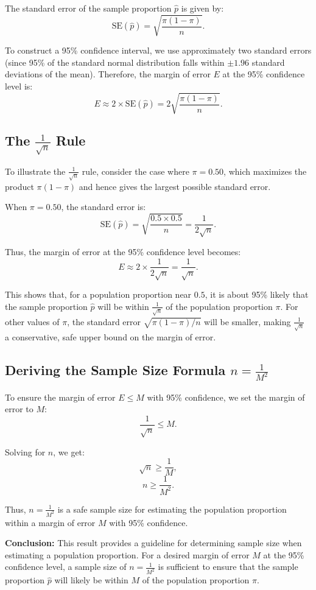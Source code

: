 \documentclass{article}
\begin{document}
The standard error of the sample proportion \( \hat{p} \) is given by:
\[
\text{SE}(\hat{p}) = \sqrt{\frac{\pi (1 - \pi)}{n}}.
\]

To construct a 95\% confidence interval, we use approximately two standard errors (since 95\% of the standard normal distribution falls within \(\pm 1.96\) standard deviations of the mean). Therefore, the margin of error \( E \) at the 95\% confidence level is:
\[
E \approx 2 \times \text{SE}(\hat{p}) = 2 \sqrt{\frac{\pi (1 - \pi)}{n}}.
\]

\subsection*{The \( \frac{1}{\sqrt{n}} \) Rule}

To illustrate the \( \frac{1}{\sqrt{n}} \) rule, consider the case where \( \pi = 0.50 \), which maximizes the product \( \pi(1 - \pi) \) and hence gives the largest possible standard error.

When \( \pi = 0.50 \), the standard error is:
\[
\text{SE}(\hat{p}) = \sqrt{\frac{0.5 \times 0.5}{n}} = \frac{1}{2\sqrt{n}}.
\]

Thus, the margin of error at the 95\% confidence level becomes:
\[
E \approx 2 \times \frac{1}{2\sqrt{n}} = \frac{1}{\sqrt{n}}.
\]

This shows that, for a population proportion near \( 0.5 \), it is about 95\% likely that the sample proportion \( \hat{p} \) will be within \( \frac{1}{\sqrt{n}} \) of the population proportion \( \pi \). For other values of \( \pi \), the standard error \( \sqrt{\pi(1 - \pi)/n} \) will be smaller, making \( \frac{1}{\sqrt{n}} \) a conservative, safe upper bound on the margin of error.

\subsection*{Deriving the Sample Size Formula \( n = \frac{1}{M^2} \)}

To ensure the margin of error \( E \leq M \) with 95\% confidence, we set the margin of error to \( M \):
\[
\frac{1}{\sqrt{n}} \leq M.
\]

Solving for \( n \), we get:
\[
\sqrt{n} \geq \frac{1}{M},
\]
\[
n \geq \frac{1}{M^2}.
\]

Thus, \( n = \frac{1}{M^2} \) is a safe sample size for estimating the population proportion within a margin of error \( M \) with 95\% confidence.

\textbf{Conclusion:} This result provides a guideline for determining sample size when estimating a population proportion. For a desired margin of error \( M \) at the 95\% confidence level, a sample size of \( n = \frac{1}{M^2} \) is sufficient to ensure that the sample proportion \( \hat{p} \) will likely be within \( M \) of the population proportion \( \pi \).
\end{document}

